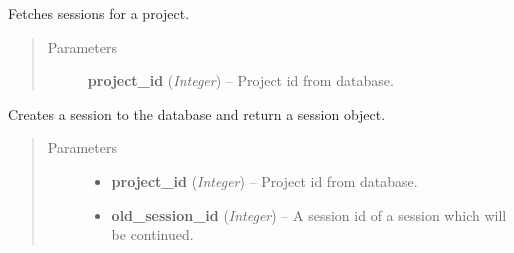 \documentclass[letterpaper,10pt,english]{sphinxmanual}
\begin{document}

\begin{fulllineitems}
\label{controller:controller.session.get_sessions_by_project}
Fetches sessions for a project.
\begin{quote}\begin{description}
\item[{Parameters}] \leavevmode
\textbf{project\_id} (\emph{Integer}) -- Project id from database.

\end{description}\end{quote}

\end{fulllineitems}


\begin{fulllineitems}
\label{controller:controller.session.start_new_session}
Creates a session to the database and return a session object.
\begin{quote}\begin{description}
\item[{Parameters}] \leavevmode\begin{itemize}
\item {} 
\textbf{project\_id} (\emph{Integer}) -- Project id from database.

\item {} 
\textbf{old\_session\_id} (\emph{Integer}) -- A session id of a session which will be continued.

\end{itemize}

\end{description}\end{quote}

\end{fulllineitems}
\end{document}
